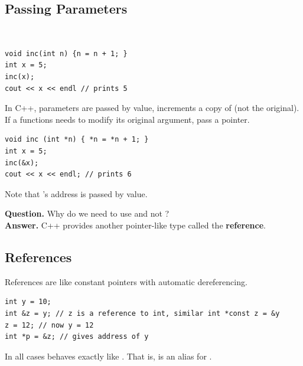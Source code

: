 \documentclass[english, 11pt]{article}
\begin{document}
\subsection{Passing Parameters}

\begin{exmp} \
  \begin{lstlisting}
void inc(int n) {n = n + 1; }
int x = 5;
inc(x);
cout << x << endl // prints 5
  \end{lstlisting}
  In C++, parameters are passed by value,  increments a copy of  (not the original). If a functions needs to modify its original argument, pass a pointer.
\end{exmp}

\begin{lstlisting}
void inc (int *n) { *n = *n + 1; }
int x = 5;
inc(&x);
cout << x << endl; // prints 6
\end{lstlisting}

Note that 's address is passed by value.

\textbf{Question.} Why do we need to use  and not ? \\
\textbf{Answer.} C++ provides another pointer-like type called the \textbf{reference}.

\subsection{References}

References are like constant pointers with automatic dereferencing.
\begin{lstlisting}
int y = 10;
int &z = y; // z is a reference to int, similar int *const z = &y
z = 12; // now y = 12
int *p = &z; // gives address of y
\end{lstlisting}
In all cases  behaves exactly like . That is,  is an alias for . \\
\end{document}
